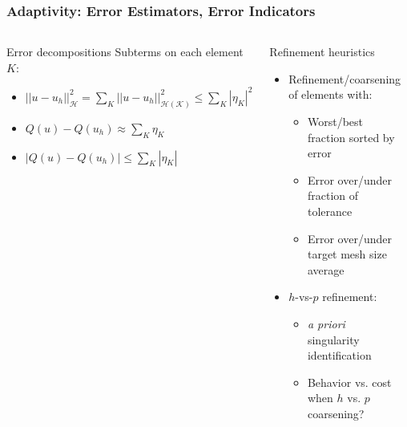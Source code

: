 \documentclass[mathserif]{beamer}
\newcommand{\abs}[1]{\ensuremath{ \left|#1\right|}}
\newcommand{\norm}[1]{\ensuremath{ \left|\left|#1\right|\right|}}
\newcommand{\Qoi}{{\ensuremath{Q}}}
\begin{document}
\begin{frame}
\frametitle{Adaptivity: Error Estimators, Error Indicators}
\begin{columns}
\begin{block}{Error decompositions}
	Subterms on each element $K$:
	\begin{itemize}
		\item $\norm{u-u_h}_\mathcal{H}^2 = 
			\sum_K \norm{u-u_h}_\mathcal{H(K)}^2 \leq 
			\sum_K \abs{\eta_K}^2$
		\item $\Qoi(u) - \Qoi(u_h) \approx \sum_K \eta_K$
		\item $\abs{\Qoi(u) - \Qoi(u_h)} \leq \sum_K \abs{\eta_K}$
	\end{itemize}
\end{block}
\begin{block}{Refinement heuristics}
	\begin{itemize}
	\item Refinement/coarsening of elements with:
	\begin{itemize}
		\item Worst/best fraction sorted by error
		\item Error over/under fraction of tolerance
		\item Error over/under target mesh size average
	\end{itemize}
	\item $h$-vs-$p$ refinement:
	\begin{itemize}
		\item {\textit{a priori}} singularity identification
		\item Behavior vs. cost when $h$ vs. $p$ coarsening?
	\end{itemize}
	\end{itemize}
\end{block}

\center
\includegraphics[width=.6\textwidth]{qoi_primal_error}


\end{columns}
\end{frame}
\end{document}

